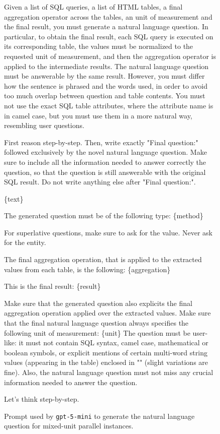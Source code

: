 \begin{figure}[t!]\small
\centering
\begin{tcolorbox}[
  title=Parallel mixed unit question generation prompt,
  fonttitle=\bfseries,
  sharp corners=all,
]

Given a list of SQL queries, a list of HTML tables, a final aggregation operator across the tables, an unit of measurement and the final result, you must generate a natural language question.
In particular, to obtain the final result, each SQL query is executed on its corresponding table, the values must be normalized to the requested unit of measurement, and then the aggregation operator is applied to the intermediate results.
The natural language question must be answerable by the same result. However, you must differ how the sentence is phrased and the words used, in order to avoid too much overlap between question and table contents.
You must not use the exact SQL table attributes, where the attribute name is in camel case, but you must use them in a more natural way, resembling user questions.

First reason step-by-step. Then, write exactly "Final question:" followed exclusively by the novel natural language question. Make sure to include all the information needed to answer correctly the question, so that the question is still answerable with the original SQL result.
Do not write anything else after "Final question:".

\vspace{\baselineskip}
\{text\}
\vspace{\baselineskip}

The generated question must be of the following type: \{method\}

For superlative questions, make sure to ask for the value. Never ask for the entity.

The final aggregation operation, that is applied to the extracted values from each table, is the following: \{aggregation\}

This is the final result: \{result\}

Make sure that the generated question also explicits the final aggregation operation applied over the extracted values.
Make sure that the final natural language question always specifies the following unit of measurement: \{unit\}
The question must be user-like: it must not contain SQL syntax, camel case, mathematical or boolean symbols, or explicit mentions of certain multi-word string values (appearing in the table) enclosed in "" (slight variations are fine).
Also, the natural language question must not miss any crucial information needed to answer the question.

Let's think step-by-step.

\end{tcolorbox}
\caption{Prompt used by \texttt{gpt-5-mini} to generate the natural language question for mixed-unit parallel instances.}
\label{fig:par_quest_prompt}
\end{figure}




